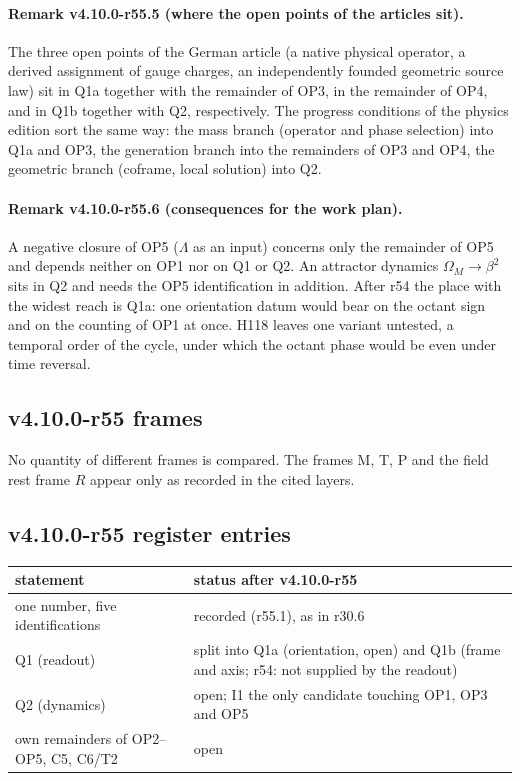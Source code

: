 \paragraph{Remark v4.10.0-r55.5 (where the open points of the articles sit).}
The three open points of the German article (a native physical operator, a derived assignment of gauge charges, an independently founded
geometric source law) sit in Q1a together with the remainder of OP3, in the remainder of OP4, and in Q1b together with Q2, respectively.  The
progress conditions of the physics edition sort the same way: the mass branch (operator and phase selection) into Q1a and OP3, the generation
branch into the remainders of OP3 and OP4, the geometric branch (coframe, local solution) into Q2.

\paragraph{Remark v4.10.0-r55.6 (consequences for the work plan).}
A negative closure of OP5 (\(\Lambda\) as an input) concerns only the remainder of OP5 and depends neither on OP1 nor on Q1 or Q2.  An attractor
dynamics \(\Omega_M\to\beta^2\) sits in Q2 and needs the OP5 identification in addition.  After r54 the place with the widest reach is Q1a: one orientation
datum would bear on the octant sign and on the counting of OP1 at once.  H118 leaves one variant untested, a temporal order of the cycle, under
which the octant phase would be even under time reversal.

\subsection*{v4.10.0-r55 frames}
\label{subsec:v4100-r55-frames}

No quantity of different frames is compared.  The frames M, T, P and the field rest frame \(R\) appear only as recorded in the cited layers.

\subsection*{v4.10.0-r55 register entries}
\label{subsec:v4100-r55-register}

\begin{center}
\small
\begin{tabular}{@{}>{\raggedright\arraybackslash}p{}>{\raggedright\arraybackslash}p{}@{}}
\toprule
statement & status after v4.10.0-r55\\
\midrule
one number, five identifications & recorded (r55.1), as in r30.6\\
Q1 (readout) & split into Q1a (orientation, open) and Q1b (frame and axis; r54: not supplied by the readout)\\
Q2 (dynamics) & open; I1 the only candidate touching OP1, OP3 and OP5\\
own remainders of OP2--OP5, C5, C6/T2 & open\\
\bottomrule
\end{tabular}
\end{center}

